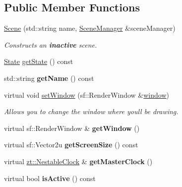 \subsection*{Public Member Functions}
\begin{DoxyCompactItemize}
\item 
\hyperlink{classzt_1_1_scene_af30ef0d6fa9fcdbada43d51f594b1f09}{Scene} (std\+::string name, \hyperlink{classzt_1_1_scene_manager}{Scene\+Manager} \&scene\+Manager)
\begin{DoxyCompactList}\small\item\em Constructs an {\bfseries inactive} scene. \end{DoxyCompactList}\item 
\hyperlink{classzt_1_1_scene_a5618d9448cd874af20a6be8ed60c87a5}{State} \hyperlink{classzt_1_1_scene_a8ee519dcf39f795ebcaf6b3cb2dbb930}{get\+State} () const
\item 
\mbox{\label{classzt_1_1_scene_a82fa58fe125a30505c46d94d381e289d}} 
std\+::string {\bfseries get\+Name} () const
\item 
virtual void \hyperlink{classzt_1_1_scene_ac7b62a9ada72130fd1d131c080e9a339}{set\+Window} (sf\+::\+Render\+Window \&\hyperlink{classzt_1_1_scene_a03f12b88348262d18487f2381f5874b1}{window})
\begin{DoxyCompactList}\small\item\em Allows you to change the window where you\textquotesingle{}ll be drawing. \end{DoxyCompactList}\item 
\mbox{\label{classzt_1_1_scene_a53c482a19ae48fdce5fc3af5e8f3022b}} 
virtual sf\+::\+Render\+Window \& {\bfseries get\+Window} ()
\item 
\mbox{\label{classzt_1_1_scene_a571cfe15ea9f8e0b3f1bab35c6d97c6b}} 
virtual sf\+::\+Vector2u {\bfseries get\+Screen\+Size} () const
\item 
\mbox{\label{classzt_1_1_scene_adb5f61d68371bdf121766e4bc6116ebe}} 
virtual \hyperlink{classzt_1_1_nestable_clock}{zt\+::\+Nestable\+Clock} \& {\bfseries get\+Master\+Clock} ()
\item 
\mbox{\label{classzt_1_1_scene_a784e245a00b9245faf57d6a6186e8d04}} 
virtual bool {\bfseries is\+Active} () const

\end{DoxyCompactItemize}
